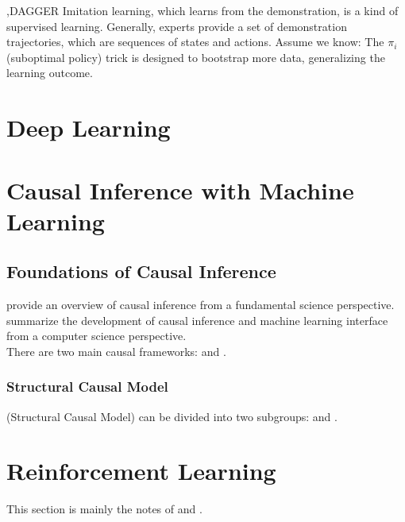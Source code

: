 \documentclass[12pt]{report}
\begin{document}
\sep{DAGGER}
Imitation learning, which learns from the demonstration, is a kind of supervised learning. Generally, experts provide a set of demonstration trajectories, which are sequences of states
and actions. Assume we know:
The $\pi_i$ (suboptimal policy) trick is designed to bootstrap more data, generalizing the learning outcome.

\clearpage
\section{Deep Learning}

\clearpage
\section{Causal Inference with Machine Learning}

\subsection{Foundations of Causal Inference}

\cite{peters2017elements} provide an overview of causal inference from a fundamental science perspective. \cite{spirtes2010introduction}
summarize the development of causal inference and machine learning interface from a computer science perspective.\\
There are two main causal frameworks:  and .

\subsubsection{Structural Causal Model}
 (Structural Causal Model) can be divided into two subgroups:  and .

\clearpage
\section{Reinforcement Learning}

This section is mainly the notes of \cite{thrun2000reinforcement} and \cite{agarwal2019reinforcement}.
\end{document}
